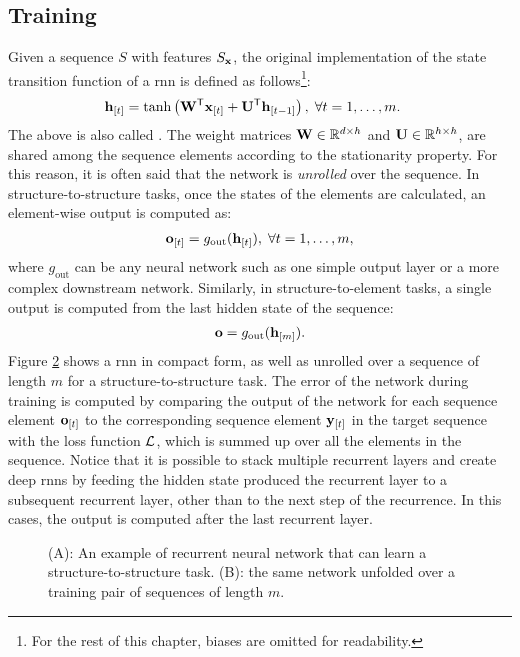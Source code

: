 \subsection{Training}
Given a sequence $S$ with features $S_{\Vector{x}}$, the original implementation of the state transition function of a \gls{rnn} is defined as follows\footnote{For the rest of this chapter, biases are omitted for readability.}:
\begin{align*}
    \Elem{h}{t} &= \Fun{tanh}\Paren{\Matrix{W}^{\Transpose}\Elem{x}{t} + \Matrix{U}^{\Transpose}\Elem{h}{t-1}},\; \forall t=1, \ldots, m.
\end{align*}
The above is also called . The weight matrices $\Matrix{W} \in \Real^{d \times h}$ and $\Matrix{U} \in \Real^{h \times h}$, are shared among the sequence elements according to the stationarity property. For this reason, it is often said that the network is \emph{unrolled} over the sequence. In structure-to-structure tasks, once the states of the elements are calculated, an element-wise output is computed as:
\begin{align*}
    \Elem{o}{t} = g_{\mathrm{out}}(\Elem{h}{t}),\; \forall t=1, \ldots, m,
\end{align*}
where $g_{\mathrm{out}}$ can be any neural network such as one simple output layer or a more complex downstream network. Similarly, in structure-to-element tasks, a single output is computed from the last hidden state of the sequence:
\begin{align*}
    \Vector{o} = g_{\mathrm{out}}(\Elem{h}{m}).
\end{align*}
Figure \ref{fig:rnn-unfold} shows a \gls{rnn} in compact form, as well as unrolled over a sequence of length $m$ for a structure-to-structure task. The error of the network during training is computed by comparing the output of the network for each sequence element $\Elem{o}{t}$ to the corresponding sequence element $\Elem{y}{t}$ in the target sequence with the loss function $\mathcal{L}$, which is summed up over all the elements in the sequence. Notice that it is possible to stack multiple recurrent layers and create deep \glspl{rnn} by feeding the hidden state produced the recurrent layer to a subsequent recurrent layer, other than to the next step of the recurrence. In this cases, the output is computed after the last recurrent layer.
\begin{figure*}[h!]
    \begin{subfigure}[b]{0.4\linewidth}
        \centering
        \resizebox{.6\textwidth}{!}{}
        \caption{}
        \label{fig:rnn}
    \end{subfigure}
    \begin{subfigure}[b]{0.59\linewidth}
        \centering
        \resizebox{.8\textwidth}{!}{}
        \caption{}
        \label{fig:rnn-unfold}
    \end{subfigure}
    \caption{(A): An example of recurrent neural network that can learn a structure-to-structure task. (B): the same network unfolded over a training pair of sequences of length $m$.}
    \label{fig:rnn-example}
\end{figure*}

